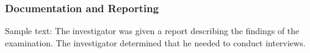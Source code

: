 \subsubsection{Documentation and Reporting}

Sample text: 
The investigator was given a report describing the findings of the examination. The investigator determined that he needed to conduct interviews. 


